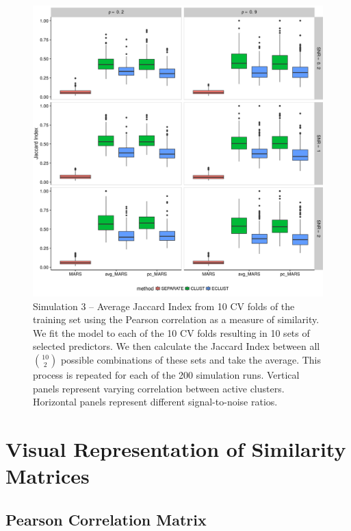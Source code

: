\begin{appendices}
\begin{figure}[H]
	\centering
	\includegraphics[scale=0.6, keepaspectratio]{./figs/hydra/results/figures/sim3-sept27/jacc_Correlation_sim3.png}
	\caption{Simulation 3 -- Average Jaccard Index from 10 CV folds of the training set using the Pearson correlation as a measure of similarity. We fit the model to each of the 10 CV folds resulting in 10 sets of selected predictors. We then calculate the Jaccard Index between all $\binom{10}{2}$ possible combinations of these sets and take the average. This process is repeated for each of the 200 simulation runs. Vertical panels represent varying correlation between active clusters. Horizontal panels represent different signal-to-noise ratios.}
	\label{fig:jacc_Correlation_sim3}
\end{figure}





\section{Visual Representation of Similarity Matrices}\label{ap:similaritymatrices}


\subsection*{Pearson Correlation Matrix}


\end{appendices}
